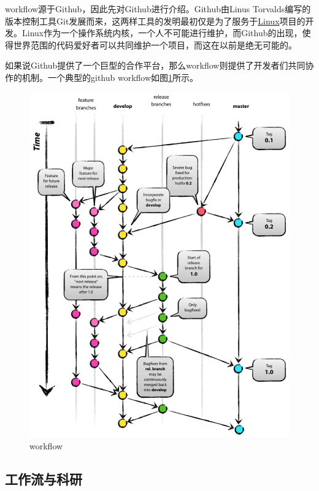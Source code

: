 \documentclass[UTF8]{ctexbook}
\begin{document}
workflow源于Github，因此先对Github进行介绍。Github由Linus Torvalds编写的版本控制工具Git发展而来，这两样工具的发明最初仅是为了服务于\href{https://github.com/torvalds/linux}{Linux}项目的开发。Linux作为一个操作系统内核，一个人不可能进行维护，而Github的出现，使得世界范围的代码爱好者可以共同维护一个项目，而这在以前是绝无可能的。

如果说Github提供了一个巨型的合作平台，那么workflow则提供了开发者们共同协作的机制。一个典型的github workflow如图\ref{fig:workflow}所示。

\begin{figure}[!htb]
	\centering
	\includegraphics[width=1\linewidth]{Figure/workflow.pdf}
	\vspace{-0.3cm}
	\caption{workflow}\label{fig:workflow}
\end{figure}

\subsection{工作流与科研}
\end{document}
